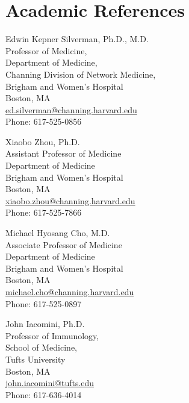 \documentclass[letterpaper, 10pt]{article}
\begin{document}
\section*{Academic References}

\begin{minipage}[ht]{.50\textwidth}
Edwin Kepner Silverman, Ph.D., M.D. \\
Professor of Medicine, \\
Department of Medicine, \\
Channing Division of Network Medicine, \\
Brigham and Women's Hospital \\
Boston, MA \\
\href{mailto:ed.silverman@channing.harvard.edu}{ed.silverman@channing.harvard.edu} \\
Phone: 617-525-0856
\end{minipage}

\begin{minipage}[ht]{.50\textwidth}
Xiaobo Zhou, Ph.D. \\
Assistant Professor of Medicine \\
Department of Medicine \\
Brigham and Women's Hospital \\
Boston, MA \\
\href{mailto:xiaobo.zhou@channing.harvard.edu}{xiaobo.zhou@channing.harvard.edu} \\
Phone: 617-525-7866
\end{minipage}

\begin{minipage}[ht]{.50\textwidth}
Michael Hyosang Cho, M.D. \\
Associate Professor of Medicine \\
Department of Medicine \\
Brigham and Women's Hospital \\
Boston, MA \\
\href{mailto:michael.cho@channing.harvard.edu}{michael.cho@channing.harvard.edu} \\
Phone: 617-525-0897
\end{minipage}

\begin{minipage}[ht]{.50\textwidth}
John Iacomini, Ph.D. \\
Professor of Immunology, \\
School of Medicine, \\
Tufts University \\
Boston, MA \\
\href{mailto:john.iacomini@tufts.edu}{john.iacomini@tufts.edu} \\
Phone: 617-636-4014
\end{minipage}
\end{document}
